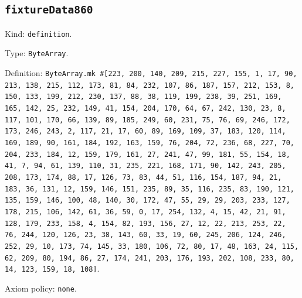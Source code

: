 \documentclass[11pt]{article}
\begin{document}
\subsection*{\texttt{fixtureData860}}
\noindent Kind: \texttt{definition}.\par
\noindent Type: \texttt{ByteArray}.\par
\noindent Definition: \texttt{ByteArray.mk \#[223, 200, 140, 209, 215, 227, 155, 1, 17, 90, 213, 138, 215, 112, 173, 81, 84, 232, 107, 86, 187, 157, 212, 153, 8, 150, 133, 199, 212, 230, 137, 88, 38, 119, 199, 238, 39, 251, 169, 165, 142, 25, 232, 149, 41, 154, 204, 170, 64, 67, 242, 130, 23, 8, 117, 101, 170, 66, 139, 89, 185, 249, 60, 231, 75, 76, 69, 246, 172, 173, 246, 243, 2, 117, 21, 17, 60, 89, 169, 109, 37, 183, 120, 114, 169, 189, 90, 161, 184, 192, 163, 159, 76, 204, 72, 236, 68, 227, 70, 204, 233, 184, 12, 159, 179, 161, 27, 241, 47, 99, 181, 55, 154, 18, 41, 7, 94, 61, 139, 110, 31, 235, 221, 168, 171, 90, 142, 243, 205, 208, 173, 174, 88, 17, 126, 73, 83, 44, 51, 116, 154, 187, 94, 21, 183, 36, 131, 12, 159, 146, 151, 235, 89, 35, 116, 235, 83, 190, 121, 135, 159, 146, 100, 48, 140, 30, 172, 47, 55, 29, 29, 203, 233, 127, 178, 215, 106, 142, 61, 36, 59, 0, 17, 254, 132, 4, 15, 42, 21, 91, 128, 179, 233, 158, 4, 154, 82, 193, 156, 27, 12, 22, 213, 253, 22, 76, 244, 120, 126, 23, 38, 143, 60, 33, 19, 60, 245, 206, 124, 246, 252, 29, 10, 173, 74, 145, 33, 180, 106, 72, 80, 17, 48, 163, 24, 115, 62, 209, 80, 194, 86, 27, 174, 241, 203, 176, 193, 202, 108, 233, 80, 14, 123, 159, 18, 108]}.\par
\noindent Axiom policy: \texttt{none}.\par
\end{document}
